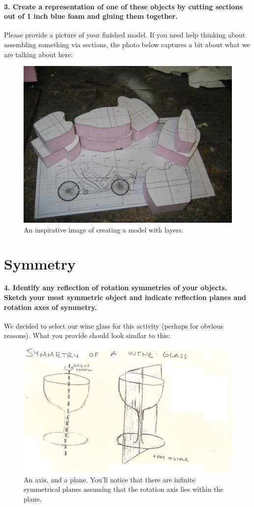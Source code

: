 \documentclass{article}
\begin{document}
\vspace{10cm}

\paragraph{3. Create a representation of one of these objects by cutting sections out of 1 inch blue foam and gluing them together.} 

Please provide a picture of your finished model. If you need help thinking about assembling something via sections, the photo below captures a bit about what we are talking about here:

\begin{figure}[h!]
    \centering
    \includegraphics[width = 0.55\columnwidth]{figs_and_code/moremodelsections.jpg}
    \caption{An inspirative image of creating a model with layers.}
\end{figure}


\section{Symmetry}

\paragraph{4. Identify any reflection of rotation symmetries of your objects. Sketch your most symmetric object and indicate reflection planes and rotation axes of symmetry.} 

We decided to select our wine glass for this activity (perhaps for obvious reasons). What you provide should look similar to this:

\begin{figure}[h!]
    \centering
    \includegraphics[width=0.75\columnwidth]{figs_and_code/symmetry_wine.png}
    \caption{An axis, and a plane. You'll notice that there are infinite symmetrical planes assuming that the rotation axis lies within the plane.}
\end{figure}
\end{document}
